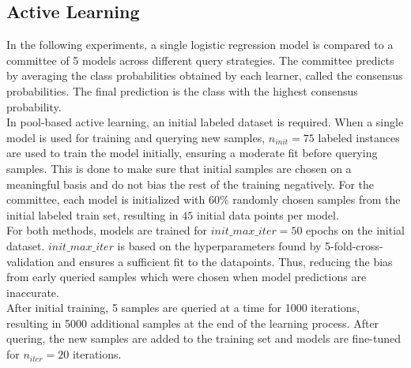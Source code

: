 \documentclass{article}
\theoremstyle{plain}
\theoremstyle{definition}
\theoremstyle{remark}
\begin{document}
\subsection{Active Learning}
In the following experiments, a single logistic regression model is compared to a committee of 5 models across different query strategies. The committee predicts by averaging the class probabilities obtained by each learner, called the consensus probabilities. The final prediction is the class with the highest consensus probability. \\
In pool-based active learning, an initial labeled dataset is required. When a single model is used for training and querying new samples, $n_{init}=75$ labeled instances are used to train the model initially, ensuring a moderate fit before querying samples. This is done to make sure that initial samples are chosen on a meaningful basis and do not bias the rest of the training negatively. For the committee, each model is initialized with $60\%$ randomly chosen samples from the initial labeled train set, resulting in $45$ initial data points per model. \\
For both methods, models are trained for $init\_max\_iter=50$ epochs on the initial dataset. $init\_max\_iter$ is based on the hyperparameters found by 5-fold-cross-validation and ensures a sufficient fit to the datapoints. Thus, reducing the bias from early queried samples which were chosen when model predictions are inaccurate. \\
After initial training, 5 samples are queried at a time for 1000 iterations, resulting in 5000 additional samples at the end of the learning process. After quering, the new samples are added to the training set and models are fine-tuned for $n_{iter}=20$ iterations. 
\end{document}
